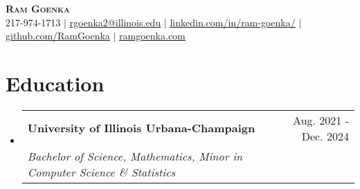 \documentclass[letterpaper,11pt]{article}
\makeatletter
\newcommand{\resumeSubheading}[4]{
  \vspace{-2pt}\item
    \begin{tabular*}{0.97\textwidth}[t]{l@{\extracolsep{\fill}}r}
      \textbf{#1} & #2 \\
      \textit{\small#3} & \textit{\small #4} \\
    \end{tabular*}\vspace{-7pt}
}
\newcommand{\resumeSubheading}[4]{
  \vspace{-2pt}\item
    \begin{tabular*}{0.97\textwidth}[t]{l@{\extracolsep{\fill}}r}
      \textbf{#1} & #2 \\
      \textit{\small#3} & \textit{\small #4} \\
    \end{tabular*}\vspace{-7pt}
}
\newcommand{\resumeSubHeadingListStart}{\begin{itemize}[leftmargin=0.15in, label={}]}
\newcommand{\resumeSubHeadingListEnd}{\end{itemize}}
\makeatother
\begin{document}
\begin{center}
    \textbf{\Huge \scshape Ram Goenka} \\ \vspace{1pt}
    \small 217-974-1713 $|$ \href{mailto:rgoenka2@illinois.edu}{\underline{rgoenka2@illinois.edu}} $|$ 
    \href{https://www.linkedin.com/in/ram-goenka/}{\underline{linkedin.com/in/ram-goenka/}} $|$
    \href{https://github.com/RamGoenka}{\underline{github.com/RamGoenka}} $|$
    \href{http://ramgoenka.com/}{\underline{ramgoenka.com}}
\end{center}

\section{Education}
  \resumeSubHeadingListStart
    \resumeSubheading
      {University of Illinois Urbana-Champaign}{Aug. 2021 - Dec. 2024}
      {Bachelor of Science, Mathematics, Minor in Computer Science \& Statistics}{~}
  \resumeSubHeadingListEnd


\end{document}
